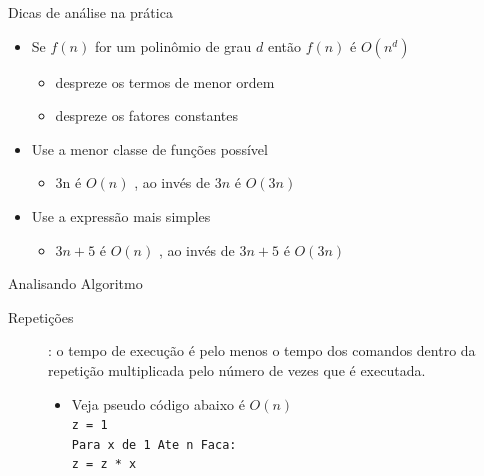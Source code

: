 \documentclass{beamer}
\begin{document}
%
%
%


\begin{frame}{Dicas de análise na prática}

\begin{itemize}
 \item Se $f(n)$ for um polinômio de grau $d$ então $f(n)$ é $O(n^d)$
 \begin{itemize}
  \item despreze os termos de menor ordem
  \item despreze os fatores constantes
 \end{itemize}
\item Use a menor classe de funções possível
\begin{itemize}
 \item 3n é $O(n)$ , ao invés de $3n$ é $O(3n)$ 
\end{itemize}
\item Use a expressão mais simples
\begin{itemize}
 \item $3n + 5$ é $O(n)$ , ao invés de $3n + 5$ é $O(3n)$
\end{itemize}

\end{itemize}

\end{frame}

\begin{frame}{Analisando Algoritmo}

\begin{description}
 \item[Repetições]: o tempo de execução é pelo menos o tempo dos
comandos dentro da repetição multiplicada pelo número de vezes que
é executada.
\begin{itemize}
 \item Veja pseudo código abaixo é $O(n)$\\
   \texttt{z = 1 \\
   Para x de 1 Ate n Faca:\\
        \hspace{1 cm}z = z * x}
\end{itemize}

\end{description}

\end{frame}
\end{document}
